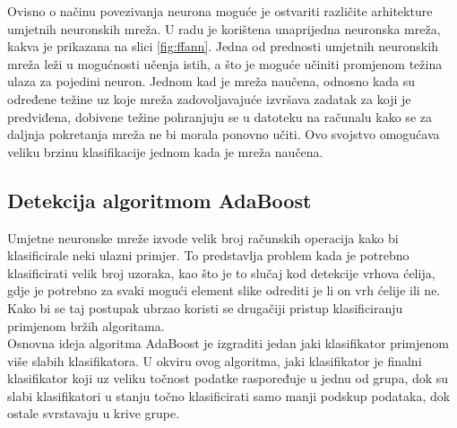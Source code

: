 \documentclass[times, utf8, zavrsni, numeric]{fer}
\begin{document}
Ovisno o načinu povezivanja neurona moguće je ostvariti različite arhitekture umjetnih neuronskih mreža. 
U radu je korištena unaprijedna neuronska mreža, kakva je prikazana na slici \ref{fig:ffann}.
Jedna od prednosti umjetnih neuronskih mreža leži u mogućnosti učenja istih, a što je moguće učiniti promjenom težina ulaza za pojedini neuron.
Jednom kad je mreža naučena, odnosno kada su određene težine uz koje mreža zadovoljavajuće izvršava zadatak za koji je predviđena, dobivene težine pohranjuju se u datoteku na računalu kako se za daljnja pokretanja mreža ne bi morala ponovno učiti.
Ovo svojstvo omogućava veliku brzinu klasifikacije jednom kada je mreža naučena.

\subsection{Detekcija algoritmom AdaBoost}
Umjetne neuronske mreže izvode velik broj računskih operacija kako bi klasificirale neki ulazni primjer.
To predstavlja problem kada je potrebno klasificirati velik broj uzoraka, kao što je to slučaj kod detekcije vrhova ćelija, gdje je potrebno za svaki mogući element slike odrediti je li on vrh ćelije ili ne.
Kako bi se taj postupak ubrzao koristi se drugačiji pristup klasificiranju primjenom bržih algoritama. \\

Osnovna ideja algoritma AdaBoost je izgraditi jedan jaki klasifikator primjenom više slabih klasifikatora.
U okviru ovog algoritma, jaki klasifikator je finalni klasifikator koji uz veliku točnost podatke raspoređuje u jednu od grupa, dok su slabi klasifikatori u stanju točno klasificirati samo manji podskup podataka, dok ostale svrstavaju u krive grupe.\\
\end{document}
